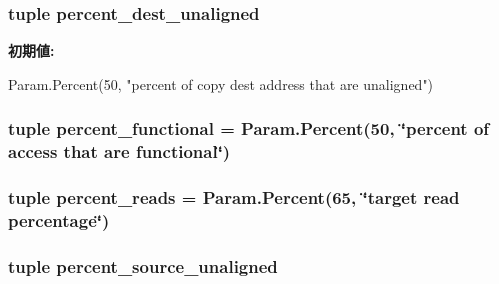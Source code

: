 \label{classMemTest_1_1MemTest_a1cf2f09c6d685e8208dc29b8d059c7ae}
\hypertarget{classMemTest_1_1MemTest_aec9cf691794f99291fb81c7d93400e5d}{
\subsubsection[{percent\_\-dest\_\-unaligned}]{\setlength{\rightskip}{0pt plus 5cm}tuple {\bf percent\_\-dest\_\-unaligned}}}
\label{classMemTest_1_1MemTest_aec9cf691794f99291fb81c7d93400e5d}
{\bfseries 初期値:}
\begin{DoxyCode}
Param.Percent(50,
        "percent of copy dest address that are unaligned")
\end{DoxyCode}
\hypertarget{classMemTest_1_1MemTest_a9710758ce3bb6a6ec2b0aa194918399b}{
\subsubsection[{percent\_\-functional}]{\setlength{\rightskip}{0pt plus 5cm}tuple {\bf percent\_\-functional} = Param.Percent(50, \char`\"{}percent of access that are {\bf functional}\char`\"{})}}
\label{classMemTest_1_1MemTest_a9710758ce3bb6a6ec2b0aa194918399b}
\hypertarget{classMemTest_1_1MemTest_a4973154d328ff1b1c957fe66c92a988e}{
\subsubsection[{percent\_\-reads}]{\setlength{\rightskip}{0pt plus 5cm}tuple {\bf percent\_\-reads} = Param.Percent(65, \char`\"{}target read percentage\char`\"{})}}
\label{classMemTest_1_1MemTest_a4973154d328ff1b1c957fe66c92a988e}
\hypertarget{classMemTest_1_1MemTest_a143c80dade2755876d9bf20c20f98a9e}{
\subsubsection[{percent\_\-source\_\-unaligned}]{\setlength{\rightskip}{0pt plus 5cm}tuple {\bf percent\_\-source\_\-unaligned}}}
